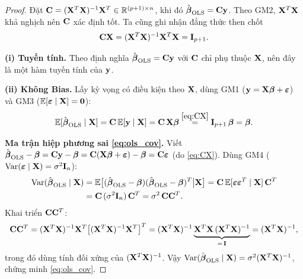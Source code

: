 \begin{proof}
Đặt $\mathbf{C} = (\mathbf{X}^T\mathbf{X})^{-1}\mathbf{X}^T \in \mathbb{R}^{(p+1)\times n}$, khi đó
$\hat{\boldsymbol{\beta}}_{\mathrm{OLS}} = \mathbf{C}\mathbf{y}$. Theo GM2, $\mathbf{X}^T\mathbf{X}$
khả nghịch nên $\mathbf{C}$ xác định tốt. Ta cũng ghi nhận đẳng thức then chốt
\begin{equation}
    \mathbf{C}\mathbf{X}
    = (\mathbf{X}^T\mathbf{X})^{-1}\mathbf{X}^T\mathbf{X}
    = \mathbf{I}_{p+1}.
    \label{eq:CX}
\end{equation}

\medskip
\noindent\textbf{(i) Tuyến tính.}
Theo định nghĩa $\hat{\boldsymbol{\beta}}_{\mathrm{OLS}} = \mathbf{C}\mathbf{y}$ với $\mathbf{C}$
chỉ phụ thuộc $\mathbf{X}$, nên đây là một hàm tuyến tính của $\mathbf{y}$.

\medskip
\noindent\textbf{(ii) Không Bias.}
Lấy kỳ vọng có điều kiện theo $\mathbf{X}$, dùng GM1 ($\mathbf{y} = \mathbf{X}\boldsymbol{\beta}
+ \boldsymbol{\varepsilon}$) và GM3 ($\mathbb{E}[\boldsymbol{\varepsilon}\mid\mathbf{X}] = \mathbf{0}$):
\[
    \mathbb{E}[\hat{\boldsymbol{\beta}}_{\mathrm{OLS}}\mid\mathbf{X}]
    = \mathbf{C}\,\mathbb{E}[\mathbf{y}\mid\mathbf{X}]
    = \mathbf{C}\,\mathbf{X}\boldsymbol{\beta}
    \overset{\eqref{eq:CX}}{=} \mathbf{I}_{p+1}\,\boldsymbol{\beta}
    = \boldsymbol{\beta}.
\]

\medskip
\noindent\textbf{Ma trận hiệp phương sai \eqref{eq:ols_cov}.}
Viết $\hat{\boldsymbol{\beta}}_{\mathrm{OLS}} - \boldsymbol{\beta}
= \mathbf{C}\mathbf{y} - \boldsymbol{\beta}
= \mathbf{C}(\mathbf{X}\boldsymbol{\beta} + \boldsymbol{\varepsilon}) - \boldsymbol{\beta}
= \mathbf{C}\boldsymbol{\varepsilon}$ (do \eqref{eq:CX}). Dùng GM4
($\mathrm{Var}(\boldsymbol{\varepsilon}\mid\mathbf{X}) = \sigma^2\mathbf{I}_n$):
\begin{align*}
    \mathrm{Var}(\hat{\boldsymbol{\beta}}_{\mathrm{OLS}}\mid\mathbf{X})
    &= \mathbb{E}\bigl[(\hat{\boldsymbol{\beta}}_{\mathrm{OLS}} - \boldsymbol{\beta})
              (\hat{\boldsymbol{\beta}}_{\mathrm{OLS}} - \boldsymbol{\beta})^T
              \big|\mathbf{X}\bigr]
     = \mathbf{C}\,\mathbb{E}[\boldsymbol{\varepsilon}\boldsymbol{\varepsilon}^T\mid\mathbf{X}]\,\mathbf{C}^T \\
    &= \mathbf{C}\,(\sigma^2\mathbf{I}_n)\,\mathbf{C}^T
     = \sigma^2\,\mathbf{C}\mathbf{C}^T.
\end{align*}
Khai triển $\mathbf{C}\mathbf{C}^T$:
\[
    \mathbf{C}\mathbf{C}^T
    = (\mathbf{X}^T\mathbf{X})^{-1}\mathbf{X}^T
      \bigl[(\mathbf{X}^T\mathbf{X})^{-1}\mathbf{X}^T\bigr]^T
    = (\mathbf{X}^T\mathbf{X})^{-1}\underbrace{\mathbf{X}^T\mathbf{X}\,(\mathbf{X}^T\mathbf{X})^{-1}}_{=\,\mathbf{I}}
    = (\mathbf{X}^T\mathbf{X})^{-1},
\]
trong đó dùng tính đối xứng của $(\mathbf{X}^T\mathbf{X})^{-1}$. Vậy
$\mathrm{Var}(\hat{\boldsymbol{\beta}}_{\mathrm{OLS}}\mid\mathbf{X})
= \sigma^2(\mathbf{X}^T\mathbf{X})^{-1}$, chứng minh \eqref{eq:ols_cov}.


\end{proof}
